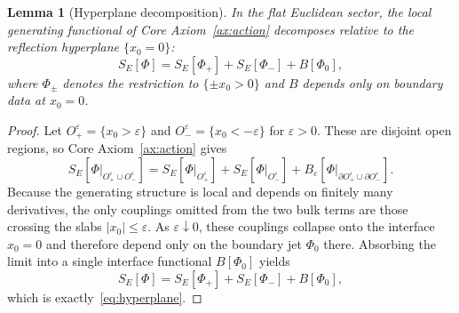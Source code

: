 \documentclass[12pt,a4paper]{article}
\theoremstyle{plain}
\newtheorem{lemma}[theorem]{Lemma}
\theoremstyle{definition}
\theoremstyle{remark}
\begin{document}
\begin{lemma}[Hyperplane decomposition]\label{lem:hyperplane}
  In the flat Euclidean sector, the local generating functional of
  Core Axiom~\ref{ax:action} decomposes relative to the reflection
  hyperplane $\{x_0 = 0\}$:
  \begin{equation}\label{eq:hyperplane}
    S_E[\Phi] = S_E[\Phi_+] + S_E[\Phi_-] + B[\Phi_0],
  \end{equation}
  where $\Phi_\pm$ denotes the restriction to $\{\pm x_0 > 0\}$ and
  $B$ depends only on boundary data at $x_0 = 0$.
\end{lemma}
\begin{proof}
  Let $O_+^\varepsilon = \{x_0 > \varepsilon\}$ and
  $O_-^\varepsilon = \{x_0 < -\varepsilon\}$ for $\varepsilon > 0$.
  These are disjoint open regions, so Core Axiom~\ref{ax:action}
  gives
  \[
    S_E[\Phi|_{O_+^\varepsilon \cup O_-^\varepsilon}]
    = S_E[\Phi|_{O_+^\varepsilon}]
    + S_E[\Phi|_{O_-^\varepsilon}]
    + B_\varepsilon[\Phi|_{\partial O_+^\varepsilon \cup \partial O_-^\varepsilon}].
  \]
  Because the generating structure is local and depends on finitely
  many derivatives, the only couplings omitted from the two bulk terms
  are those crossing the slabs $|x_0| \le \varepsilon$. As
  $\varepsilon \downarrow 0$, these couplings collapse onto the
  interface $x_0 = 0$ and therefore depend only on the boundary jet
  $\Phi_0$ there. Absorbing the limit into a single interface
  functional $B[\Phi_0]$ yields
  \[
    S_E[\Phi] = S_E[\Phi_+] + S_E[\Phi_-] + B[\Phi_0],
  \]
  which is exactly~\eqref{eq:hyperplane}.
\end{proof}
\end{document}
